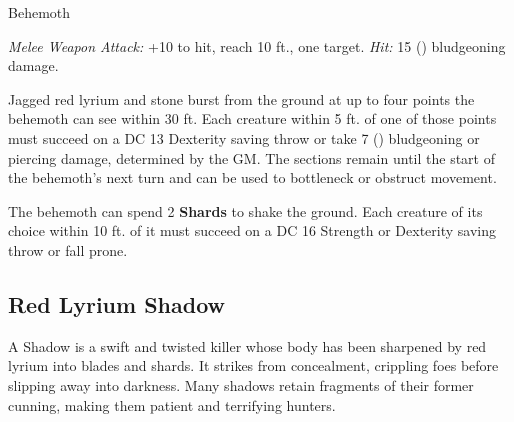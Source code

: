 \documentclass[letterpaper,twocolumn,openany,nodeprecatedcode,breakable,skins,xparse,most]{dndbook}
\begin{document}
\begin{monsterbox}{Behemoth}

\begin{rpg-monsteraction}[Bash]
\textit{Melee Weapon Attack:} +10 to hit, reach 10 ft., one target. \textit{Hit:} 15 () bludgeoning damage.
\end{rpg-monsteraction}

\begin{rpg-monsteraction}
Jagged red lyrium and stone burst from the ground at up to four points the behemoth can see within 30 ft. Each creature within 5 ft. of one of those points must succeed on a DC 13 Dexterity saving throw or take 7 () bludgeoning or piercing damage, determined by the GM. The sections remain until the start of the behemoth's next turn and can be used to bottleneck or obstruct movement.
\end{rpg-monsteraction}


\begin{rpg-monsteraction}[Quake]
The behemoth can spend 2 \textbf{Shards} to shake the ground. Each creature of its choice within 10 ft. of it must succeed on a DC 16 Strength or Dexterity saving throw or fall prone.
\end{rpg-monsteraction}

\end{monsterbox}

\newpage

\subsection{Red Lyrium Shadow}

A Shadow is a swift and twisted killer whose body has been sharpened by red lyrium into blades and shards. It strikes from concealment, crippling foes before slipping away into darkness. Many shadows retain fragments of their former cunning, making them patient and terrifying hunters.
\end{document}
